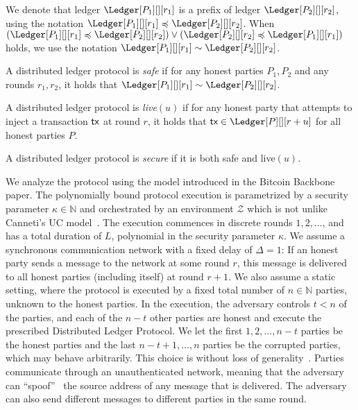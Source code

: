 We denote that ledger
$\Ledger[P_1][][r_1]$ is a prefix of ledger $\Ledger[P_2][][r_2]$,
using the notation
$\Ledger[P_1][][r_1] \preccurlyeq \Ledger[P_2][][r_2]$. When
$(\Ledger[P_1][][r_1] \preccurlyeq \Ledger[P_2][][r_2]) \lor (\Ledger[P_2][][r_2] \preccurlyeq \Ledger[P_1][][r_1])$ holds,
we use the notation $\Ledger[P_1][][r_1] \sim \Ledger[P_2][][r_2]$.

\begin{definition}[Safety]
  A distributed ledger protocol is \emph{safe} if
  for any honest parties $P_1, P_2$ and any rounds $r_1, r_2$, it holds that
  $\Ledger[P_1][][r_1] \sim \Ledger[P_2][][r_2]$.
\end{definition}

\begin{definition}[Liveness]
  A distributed ledger protocol is \emph{live}$(u)$ if
  for any honest party that attempts to inject a transaction $\textsf{tx}$
  at round $r$, it holds that $\tx \in \Ledger[P][][r+u]$
  for all honest parties $P$.
\end{definition}

\begin{definition}[Security]
  A distributed ledger protocol is \emph{secure} if it is
  both safe and live$(u)$.
\end{definition}

\noindent
{}
We analyze the protocol using the model introduced in the Bitcoin Backbone~\cite{backbone} paper.
The polynomially bound protocol execution is parametrized by a security parameter $\kappa \in \mathbb{N}$ and
orchestrated by an environment $\mathcal{Z}$ which is not unlike Canneti's UC model~\cite{uc}. The execution commences in discrete rounds $1, 2, \ldots$, and has a total duration of
$L$, polynomial in the security parameter $\kappa$.
We assume a synchronous communication network with a fixed delay of $\Delta = 1$: If an honest party sends a message
to the network at some round $r$, this message is delivered to all honest parties
(including itself) at round $r + 1$.
We also assume a static setting, where the protocol is executed by
a fixed total number of $n \in \mathbb{N}$ parties, unknown to the honest parties.
In the execution, the adversary controls $t < n$ of the parties,
and each of the $n - t$ other parties are honest and execute the prescribed Distributed Ledger
Protocol. We let the first $1, 2, \ldots, n - t$ parties be the honest parties
and the last $n - t + 1, \ldots, n$ parties be the corrupted parties, which may behave arbitrarily.
This choice is without loss of generality~\cite[Proposition 18]{backbone}.
Parties communicate through an unauthenticated network,
meaning that the adversary can ``spoof''~\cite{douceur2002sybil}
the source address of any message that is delivered. The adversary can also send
different messages to different parties in the same round.

